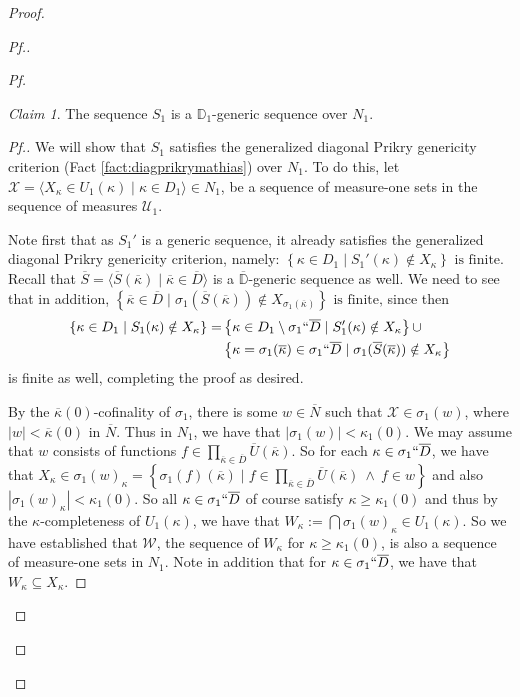 \documentclass{amsart}
\theoremstyle{definition}
\theoremstyle{remark}
\newtheorem{claimno}{Claim}
\newcommand{\D}{\mathbb{D}}
\newcommand{\N}{{\overline{N}}}
\renewcommand{\S}{{\overline{S}}}
\newcommand{\U}{\mathcal{U}}
\newcommand{\st}{\; | \;}
\newcommand{\set}[2]{\left\{#1\st #2 \right\}}
\newcommand{\seq}[2]{\langle #1 \st #2 \rangle}
\begin{document}
\begin{proof}
\begin{proof}[Pf.]
\begin{proof}[Pf]
\begin{claimno} \label{Claim:S_1isPrikryoverN_1} The sequence $S_1$ is a $\D_1$-generic sequence over $N_1$. \end{claimno}
\begin{proof}[Pf.]
We will show that $S_1$ satisfies the generalized diagonal Prikry genericity criterion (Fact \ref{fact:diagprikrymathias}) over $N_1$. To do this, let $\mathcal X = \seq{ X_\kappa \in U_1(\kappa) }{ \kappa \in D_1 } \in N_1$, be a sequence of measure-one sets in the sequence of measures $\U_1$.

Note first that as $S_1'$ is a generic sequence, it already satisfies the generalized diagonal Prikry genericity criterion, namely:
$\set{ \kappa \in D_1}{ S_1'(\kappa) \notin X_\kappa } \text{ is finite.}$
Recall that $\S = \seq{ \S(\overline \kappa) }{ \overline \kappa \in \overline D }$ is a $\overline{\D}$-generic sequence as well.
We need to see that in addition,
$\set{ \overline \kappa \in \overline D}{\sigma_1(\S(\overline \kappa)) \notin X_{\sigma_1(\overline \kappa)} }  \text{ is finite,}$
since then 
\begin{align*}
\set{ \kappa \in D_1}{ S_1(\kappa) \notin X_\kappa } = & \set{ \kappa \in D_1 \setminus \sigma_1``\overline D}{ S_1'(\kappa) \notin X_\kappa } \cup\\
& \set{ \kappa = \sigma_1(\overline \kappa) \in \sigma_1``\overline D}{\sigma_1(\S(\overline \kappa)) \notin X_\kappa }
\end{align*}
is finite as well, completing the proof as desired.

By the $\overline{\kappa}(0)$-cofinality of $\sigma_1$, there is some $w \in \N$ such that $\mathcal X \in \sigma_1(w)$, where $|w| < \overline{\kappa}(0)$ in $\N$. Thus in $N_1$, we have that $|\sigma_1(w)| < \kappa_1(0)$. 
We may assume that $w$ consists of functions $f \in \prod_{\overline \kappa \in \overline D} \overline U(\overline \kappa)$.
So for each $\kappa \in \sigma_1``\overline D$, we have that $X_\kappa \in \sigma_1(w)_\kappa =
\set{\sigma_1(f)(\overline \kappa) }{ f \in \prod_{\overline \kappa \in \overline D} \overline U(\overline \kappa) \ \land \ f \in w }$ and also $|\sigma_1(w)_\kappa|<\kappa_1(0).$ So all $\kappa \in \sigma_1``\overline D$ of course satisfy $\kappa \geq \kappa_1(0)$ and thus by the $\kappa$-completeness of $U_1(\kappa)$, we have that $W_\kappa := \bigcap \sigma_1(w)_\kappa \in  U_1(\kappa).$
So we have established that $\mathcal W$, the sequence of $W_\kappa$ for $\kappa \geq \kappa_1(0)$, is also a sequence of measure-one sets in $N_1$. Note in addition that for $\kappa \in \sigma_1``\overline D$, we have that $W_\kappa \subseteq X_\kappa$. 


\end{proof}
\end{proof}
\end{proof}
\end{proof}
\end{document}
